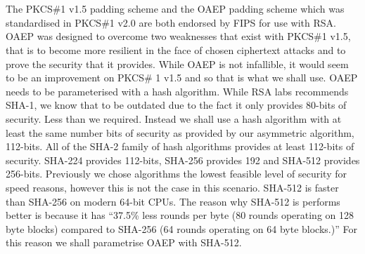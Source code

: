 \documentclass[12pt, titlepage]{article}
\begin{document}
\\
\\
The PKCS\#1 v1.5 padding scheme and the OAEP padding scheme which was standardised in PKCS\#1 v2.0 are both endorsed by FIPS for use with RSA. OAEP was designed to overcome two weaknesses that exist with PKCS\#1 v1.5, that is to become more resilient in the face of chosen ciphertext attacks and to prove the security that it provides. While OAEP is not infallible\cite{oaepAttack}, it would seem to be an improvement on PKCS\# 1 v1.5 and so that is what we shall use.
\newline \indent OAEP needs to be parameterised with a hash algorithm. While RSA labs recommends SHA-1, we know that to be outdated due to the fact it only provides 80-bits of security. Less than we required. Instead we shall use a hash algorithm with at least the same number bits of security as provided by  our asymmetric algorithm, 112-bits. All of the SHA-2 family of hash algorithms provides at least 112-bits of security. SHA-224 provides 112-bits, SHA-256 provides 192 and SHA-512 provides 256-bits. Previously we chose algorithms the lowest feasible level of security for speed reasons, however this is not the case in this scenario. SHA-512 is faster than SHA-256 on modern 64-bit CPUs. The reason why SHA-512 is performs better is because it has ``37.5\% less rounds per byte (80 rounds operating on 128 byte blocks) compared to SHA-256 (64 rounds operating on 64 byte blocks.)''\cite{sha512Faster} For this reason we shall parametrise OAEP with SHA-512.
\end{document}
